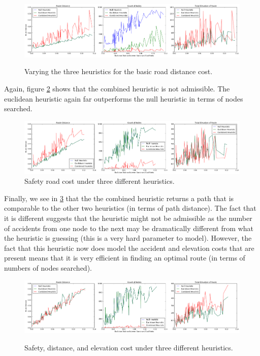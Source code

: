 \documentclass[11pt]{article}
\begin{document}
\begin{figure}[H]
\caption{Varying the three heuristics for the basic road distance cost.}
\includegraphics[width=1\textwidth]{../images/simple_distance_cost}
\label{simple_distance_cost}
\end{figure}

Again, figure \ref{simple_distance_and_safety} shows that the combined heuristic is not admissible. The euclidean heuristic again far outperforms the null heuristic in terms of nodes searched.

\begin{figure}[H]
\includegraphics[width=1\textwidth]{../images/simple_distance_and_elevation}
\caption{Safety road cost under three different heuristics.}
\label{simple_distance_and_safety}
\end{figure}

Finally, we see in \ref{simple_distance_elevation_and_safety} that the the combined heuristic returns a path that is comparable to the other two heuristics (in terms of path distance). The fact that it is different suggests that the heuristic might not be admissible as the number of accidents from one node to the next may be dramatically different from what the heuristic is guessing (this is a very hard parameter to model). However, the fact that this heuristic now does model the accident and elevation costs that are present means that it is very efficient in finding an optimal route (in terms of numbers of nodes searched).

\begin{figure}[H]
\caption{Safety, distance, and elevation cost under three different heuristics.}
\includegraphics[width=1\textwidth]{../images/simple_distance_elevation_and_safety.png}
\label{simple_distance_elevation_and_safety}
\end{figure}
\end{document}
